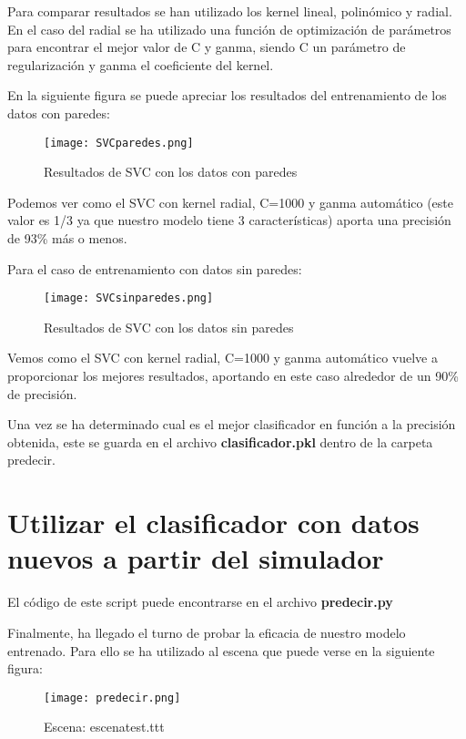 Para comparar resultados se han utilizado los kernel lineal, polinómico y radial. En el caso del radial se ha utilizado una función de optimización de parámetros para encontrar el mejor valor de C y ganma, siendo C un parámetro de regularización y ganma el coeficiente del kernel.

En la siguiente figura se puede apreciar los resultados del entrenamiento de los datos con paredes:

\begin{figure}[H]
	\centering
	\texttt{[image: SVCparedes.png]}
	\caption{Resultados de SVC con los datos con paredes}
\end{figure}

Podemos ver como el SVC con kernel radial, C=1000 y ganma automático (este valor es 1/3 ya que nuestro modelo tiene 3 características) aporta una precisión de 93\% más o menos.

Para el caso de entrenamiento con datos sin paredes:

\begin{figure}[H]
	\centering
	\texttt{[image: SVCsinparedes.png]}
	\caption{Resultados de SVC con los datos sin paredes}
\end{figure}

Vemos como el SVC con kernel radial, C=1000 y ganma automático vuelve a proporcionar los mejores resultados, aportando en este caso alrededor de un 90\% de precisión.

Una vez se ha determinado cual es el mejor clasificador en función a la precisión obtenida, este se guarda en el archivo \textbf{clasificador.pkl} dentro de la carpeta predecir.

\newpage

\section{Utilizar el clasificador con datos nuevos a partir del simulador}

El código de este script puede encontrarse en el archivo \textbf{predecir.py}

Finalmente, ha llegado el turno de probar la eficacia de nuestro modelo entrenado. Para ello se ha utilizado al escena que puede verse en la siguiente figura:
\begin{figure}[H]
	\centering
	\texttt{[image: predecir.png]}
	\caption{Escena: escenatest.ttt}
\end{figure}

